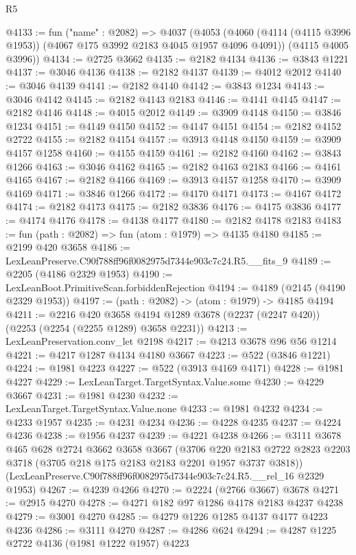 \begin{lexlean}{R5}
\begin{coremodule}
@4133 := fun ("name" : @2082) =>
  @4037
    (@4053
      (@4060 (@4114 (@4115 @3996 @1953)) (@4067 @175 @3992 @2183 @4045 @1957 @4096 @4091))
      (@4115 @4005 @3996))
@4134 := @2725 @3662
@4135 := @2182 @4134
@4136 := @3843 @1221
@4137 := @3046 @4136
@4138 := @2182 @4137
@4139 := @4012 @2012
@4140 := @3046 @4139
@4141 := @2182 @4140
@4142 := @3843 @1234
@4143 := @3046 @4142
@4145 := @2182 @4143 @2183
@4146 := @4141 @4145
@4147 := @2182 @4146
@4148 := @4015 @2012
@4149 := @3909 @4148
@4150 := @3846 @1234
@4151 := @4149 @4150
@4152 := @4147 @4151
@4154 := @2182 @4152 @2722
@4155 := @2182 @4154
@4157 := @3913 @4148 @4150
@4159 := @3909 @4157 @1258
@4160 := @4155 @4159
@4161 := @2182 @4160
@4162 := @3843 @1266
@4163 := @3046 @4162
@4165 := @2182 @4163 @2183
@4166 := @4161 @4165
@4167 := @2182 @4166
@4169 := @3913 @4157 @1258
@4170 := @3909 @4169
@4171 := @3846 @1266
@4172 := @4170 @4171
@4173 := @4167 @4172
@4174 := @2182 @4173
@4175 := @2182 @3836
@4176 := @4175 @3836
@4177 := @4174 @4176
@4178 := @4138 @4177
@4180 := @2182 @4178 @2183
@4183 := fun (path : @2082) => fun (atom : @1979) => @4135 @4180
@4185 := @2199 @420 @3658
@4186 := LexLeanPreserve.C90f788ff96f0082975d7344e903c7c24.R5.__fits_9
@4189 := @2205 (@4186 @2329 @1953)
@4190 := LexLeanBoot.PrimitiveScan.forbiddenRejection
@4194 := @4189 (@2145 (@4190 @2329 @1953))
@4197 := (path : @2082) -> (atom : @1979) -> @4185 @4194
@4211 := @2216
    @420
    @3658
    @4194
    @1289
    @3678
    (@2237 (@2247 @420))
    (@2253 (@2254 (@2255 @1289) @3658 @2231))
@4213 := LexLeanPreservation.conv_let @2198
@4217 := @4213 @3678 @96 @56 @1214
@4221 := @4217 @1287 @4134 @4180 @3667
@4223 := @522 (@3846 @1221)
@4224 := @1981 @4223
@4227 := @522 (@3913 @4169 @4171)
@4228 := @1981 @4227
@4229 := LexLeanTarget.TargetSyntax.Value.some
@4230 := @4229 @3667
@4231 := @1981 @4230
@4232 := LexLeanTarget.TargetSyntax.Value.none
@4233 := @1981 @4232
@4234 := @4233 @1957
@4235 := @4231 @4234
@4236 := @4228 @4235
@4237 := @4224 @4236
@4238 := @1956 @4237
@4239 := @4221 @4238
@4266 := @3111
    @3678
    @465
    @628
    @2724
    @3662
    @3658
    @3667
    (@3706 @220 @2183 @2722 @2823 @2203 @3718 (@3705 @218 @175 @2183 @2183 @2201 @1957 @3737 @3818))
    (LexLeanPreserve.C90f788ff96f0082975d7344e903c7c24.R5.__rel_16 @2329 @1953)
@4267 := @4239 @4266
@4270 := @2224 (@2766 @3667) @3678
@4271 := @2915 @4270
@4278 := @4271 @182 @97 @1286 @4178 @2183 @4237 @4238
@4279 := @3001 @4270
@4285 := @4279 @1226 @1285 @4137 @4177 @4223 @4236
@4286 := @3111 @4270
@4287 := @4286 @624
@4294 := @4287 @1225 @2722 @4136 (@1981 @1222 @1957) @4223

\end{coremodule}
\end{lexlean}
